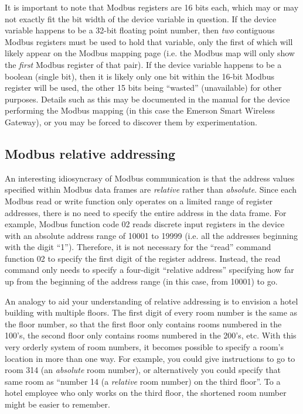 It is important to note that Modbus registers are 16 bits each, which may or may not exactly fit the bit width of the device variable in question.  If the device variable happens to be a 32-bit floating point number, then \textit{two} contiguous Modbus registers must be used to hold that variable, only the first of which will likely appear on the Modbus mapping page (i.e. the Modbus map will only show the \textit{first} Modbus register of that pair).  If the device variable happens to be a boolean (single bit), then it is likely only one bit within the 16-bit Modbus register will be used, the other 15 bits being ``wasted'' (unavailable) for other purposes.  Details such as this may be documented in the manual for the device performing the Modbus mapping (in this case the Emerson Smart Wireless Gateway), or you may be forced to discover them by experimentation.  









\filbreak
\subsection{Modbus relative addressing}

An interesting idiosyncrasy of Modbus communication is that the address values specified within Modbus data frames are \textit{relative} rather than \textit{absolute}.  Since each Modbus read or write function only operates on a limited range of register addresses, there is no need to specify the entire address in the data frame.  For example, Modbus function code 02 reads discrete input registers in the device with an absolute address range of 10001 to 19999 (i.e. all the addresses beginning with the digit ``1'').  Therefore, it is not necessary for the ``read'' command function 02 to specify the first digit of the register address.  Instead, the read command only needs to specify a four-digit ``relative address'' specifying how far up from the beginning of the address range (in this case, from 10001) to go.

An analogy to aid your understanding of relative addressing is to envision a hotel building with multiple floors.  The first digit of every room number is the same as the floor number, so that the first floor only contains rooms numbered in the 100's, the second floor only contains rooms numbered in the 200's, etc.  With this very orderly system of room numbers, it becomes possible to specify a room's location in more than one way.  For example, you could give instructions to go to room 314 (an \textit{absolute} room number), or alternatively you could specify that same room as ``number 14 (a \textit{relative} room number) on the third floor''.  To a hotel employee who only works on the third floor, the shortened room number might be easier to remember.

